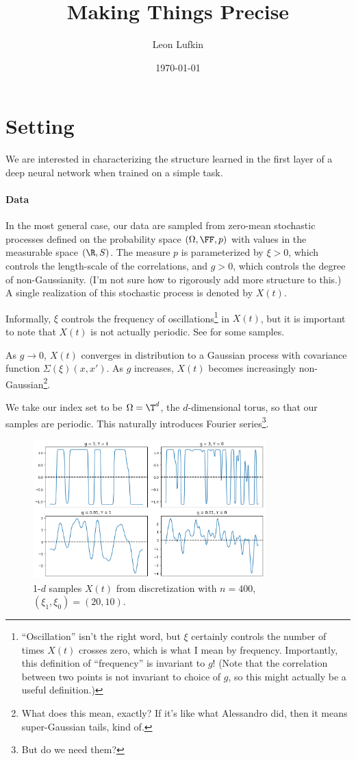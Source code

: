 \documentclass{article}
\title{Making Things Precise}
\author{Leon Lufkin}
\date{\today}
\begin{document}
\section{Setting}
We are interested in characterizing the structure learned in the first layer of a deep neural network when trained on a simple task.

\paragraph*{Data}
In the most general case, our data are sampled from zero-mean stochastic processes defined on the probability space $(\Omega, \FF, p)$ with values in the measurable space $(\R, S)$.
The measure $p$ is parameterized by $\xi > 0$, which controls the length-scale of the correlations, and $g > 0$, which controls the degree of non-Gaussianity.
(I'm not sure how to rigorously add more structure to this.)
A single realization of this stochastic process is denoted by $X(t)$.

Informally, $\xi$ controls the frequency of oscillations\footnote{``Oscillation'' isn't the right word, but $\xi$ certainly controls the number of times $X(t)$ crosses zero, which is what I mean by frequency.
Importantly, this definition of ``frequency'' is invariant to $g$!
(Note that the correlation between two points is not invariant to choice of $g$, so this might actually be a useful definition.)} in $X(t)$, but it is important to note that $X(t)$ is not actually periodic.
See  for some samples.

As $g \to 0$, $X(t)$ converges in distribution to a Gaussian process with covariance function $\Sigma(\xi)(x,x')$.
As $g$ increases, $X(t)$ becomes increasingly non-Gaussian\footnote{What does this mean, exactly? If it's like what Alessandro did, then it means super-Gaussian tails, kind of.}.

We take our index set to be $\Omega = \T^d$, the $d$-dimensional torus, so that our samples are periodic.
This naturally introduces Fourier series\footnote{But do we need them?}.

\begin{figure}[!h]
  \centering
  \includegraphics[width=0.8\textwidth]{figs/samples.png}
  \caption{1-$d$ samples $X(t)$ from discretization with $n = 400$, $(\xi_1, \xi_0) = (20, 10)$.}
  \label{fig:samples}
\end{figure}
\end{document}
